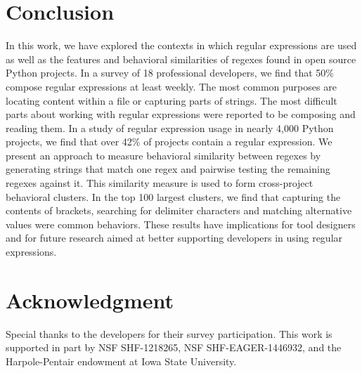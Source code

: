 \documentclass{sig-alternate-05-2015}
\begin{document}
\section{Conclusion}
\label{sec:conclusion}
In this work, we have explored the contexts in which regular expressions are used as well as the features and behavioral similarities of regexes found in open source Python projects. In a survey of 18 professional developers, we find that 50\% compose regular expressions at least weekly. The most common purposes are locating content within a file or capturing parts of strings. The most difficult parts about working with regular expressions were reported to be composing and reading them.
In a study of regular expression usage in nearly 4,000 Python projects, we find that over 42\% of projects contain a regular expression.
We present an approach to measure behavioral similarity between regexes by generating strings that match one regex and pairwise  testing the remaining regexes against it. This similarity measure is used to form cross-project behavioral clusters. In the top 100 largest clusters, we find that capturing the contents of brackets,  searching for delimiter characters and matching alternative values were common behaviors.
These results have implications for tool designers and for future research aimed at better supporting developers in using regular expressions.


\section*{Acknowledgment}
Special thanks to the  developers for their survey participation.
This work is supported in part by NSF SHF-1218265, NSF SHF-EAGER-1446932, and the Harpole-Pentair endowment at Iowa State University.

\newpage


\balance




\end{document}
